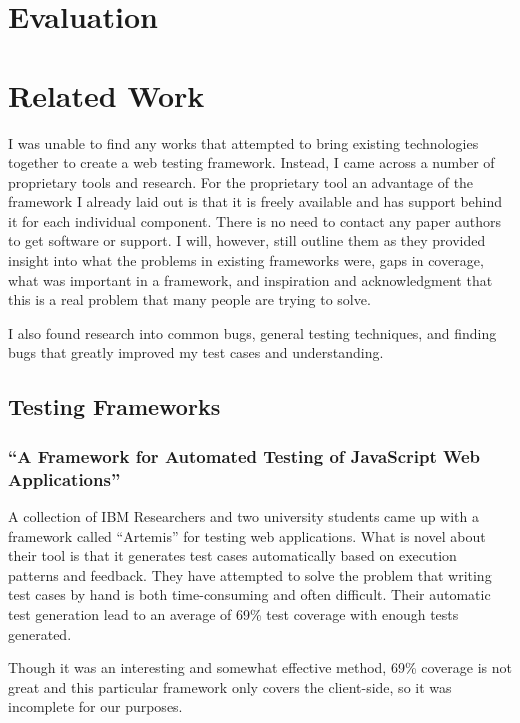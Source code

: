 \documentclass[11pt]{article}
\begin{document}
\section{Evaluation}


\section{Related Work}
I was unable to find any works that attempted to bring existing technologies together to create a web testing framework. Instead, I came across a number of proprietary tools and research. For the proprietary tool an advantage of the framework I already laid out is that it is freely available and has support behind it for each individual component. There is no need to contact any paper authors to get software or support. I will, however, still outline them as they provided insight into what the problems in existing frameworks were, gaps in coverage, what was important in a framework, and inspiration and acknowledgment that this is a real problem that many people are trying to solve.

I also found research into common bugs, general testing techniques, and finding bugs that greatly improved my test cases and understanding.

\subsection{Testing Frameworks}

\subsubsection{``A Framework for Automated Testing of JavaScript Web Applications'' \cite{FrameworkForAutomatedTesting}}
A collection of IBM Researchers and two university students came up with a framework called ``Artemis'' for testing web applications. What is novel about their tool is that it generates test cases automatically based on execution patterns and feedback. They have attempted to solve the problem that writing test cases by hand is both time-consuming and often difficult. Their automatic test generation lead to an average of 69\% test coverage with enough tests generated.

Though it was an interesting and somewhat effective method, 69\% coverage is not great and this particular framework only covers the client-side, so it was incomplete for our purposes.
\end{document}
